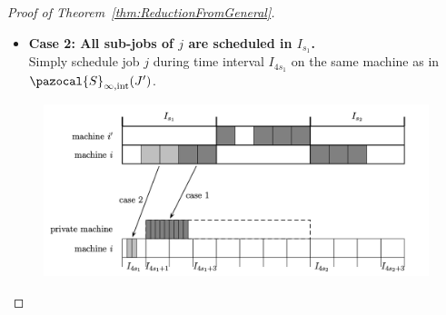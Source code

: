 \begin{proof}[Proof of Theorem~\ref{thm:ReductionFromGeneral}]
\begin{itemize}
  \item {\bf Case 2: All sub-jobs of $j$ are scheduled in $I_{s_1}$.}\\
  Simply schedule job $j$ during time interval $I_{4s_1}$ on the same machine as in $\pazocal{S}_{\infty,\text{int}}(J')$.  
\end{itemize}	
\begin{figure}
  \begin{center}
    \includegraphics[width=15cm]{chapters/scheduling1/transform}

\end{center}
\end{figure}
\end{proof}

